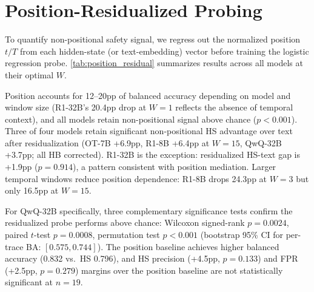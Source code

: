 \section{Position-Residualized Probing}
\label{app:position_residual}

To quantify non-positional safety signal, we regress out the normalized position $t/T$ from each hidden-state (or text-embedding) vector before training the logistic regression probe. \cref{tab:position_residual} summarizes results across all models at their optimal $W$.

\begin{table}[htbp]
\centering
\small
{}
\caption{Position-residualized probe balanced accuracy. All residualized HS probes are above chance ($p{<}0.001$). 3/4 models retain significant non-positional HS advantage over text (gap +3.7 to +6.9pp, HB corrected); R1-32B is the exception (+1.9pp, $p{=}0.914$).}
\label{tab:position_residual}
\end{table}

Position accounts for 12--20pp of balanced accuracy depending on model and window size (R1-32B's 20.4pp drop at $W{=}1$ reflects the absence of temporal context), and all models retain non-positional signal above chance ($p{<}0.001$). Three of four models retain significant non-positional HS advantage over text after residualization (OT-7B +6.9pp, R1-8B +6.4pp at $W{=}15$, QwQ-32B +3.7pp; all HB corrected). R1-32B is the exception: residualized HS-text gap is +1.9pp ($p{=}0.914$), a pattern consistent with position mediation. Larger temporal windows reduce position dependence: R1-8B drops 24.3pp at $W{=}3$ but only 16.5pp at $W{=}15$.

For QwQ-32B specifically, three complementary significance tests confirm the residualized probe performs above chance: Wilcoxon signed-rank $p{=}0.0024$, paired $t$-test $p{=}0.0008$, permutation test $p{<}0.001$ (bootstrap 95\% CI for per-trace BA: $[0.575, 0.744]$). The position baseline achieves higher balanced accuracy (0.832 vs.\ HS 0.796), and HS precision (+4.5pp, $p{=}0.133$) and FPR (+2.5pp, $p{=}0.279$) margins over the position baseline are not statistically significant at $n{=}19$.

